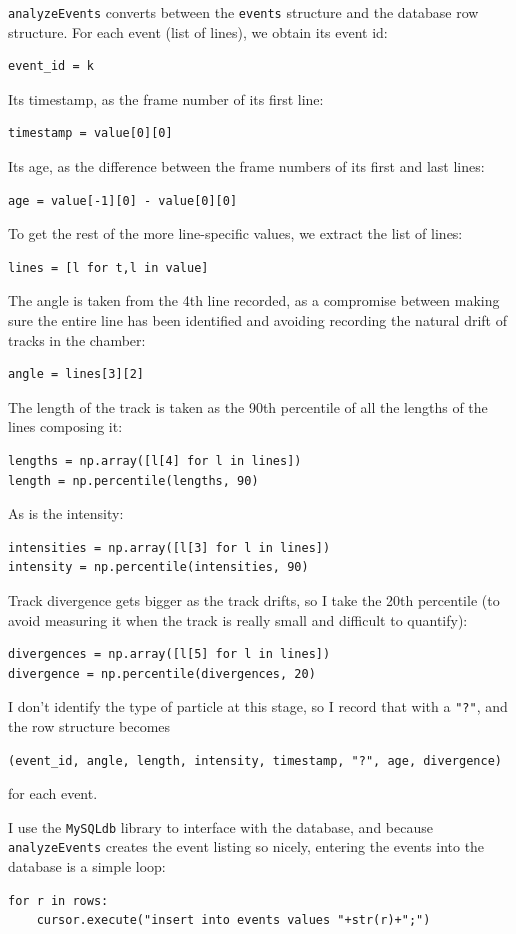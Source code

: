 \documentclass[notitlepage,12pt]{article}
\begin{document}
\texttt{analyzeEvents} converts between the \texttt{events} structure and the database row structure.  For each event (list of lines), we obtain its event id:
\begin{lstlisting}
event_id = k
\end{lstlisting}
Its timestamp, as the frame number of its first line:
\begin{lstlisting}
timestamp = value[0][0]
\end{lstlisting}
Its age, as the difference between the frame numbers of its first and last lines:
\begin{lstlisting}
age = value[-1][0] - value[0][0]
\end{lstlisting}
To get the rest of the more line-specific values, we extract the list of lines:
\begin{lstlisting}
lines = [l for t,l in value]
\end{lstlisting}
The angle is taken from the 4th line recorded, as a compromise between making sure the entire line has been identified and avoiding recording the natural drift of tracks in the chamber:
\begin{lstlisting}
angle = lines[3][2]
\end{lstlisting}
The length of the track is taken as the 90th percentile of all the lengths of the lines composing it:
\begin{lstlisting}
lengths = np.array([l[4] for l in lines])
length = np.percentile(lengths, 90)
\end{lstlisting}
As is the intensity:
\begin{lstlisting}
intensities = np.array([l[3] for l in lines])
intensity = np.percentile(intensities, 90)
\end{lstlisting}
Track divergence gets bigger as the track drifts, so I take the 20th percentile (to avoid measuring it when the track is really small and difficult to quantify):
\begin{lstlisting}
divergences = np.array([l[5] for l in lines])
divergence = np.percentile(divergences, 20)
\end{lstlisting}
I don't identify the type of particle at this stage, so I record that with a \texttt{"?"}, and the row structure becomes
\begin{lstlisting}
(event_id, angle, length, intensity, timestamp, "?", age, divergence)
\end{lstlisting}
for each event.

I use the \texttt{MySQLdb} library to interface with the database, and because \texttt{analyzeEvents} creates the event listing so nicely, entering the events into the database is a simple loop:
\begin{lstlisting}
for r in rows:
    cursor.execute("insert into events values "+str(r)+";")
\end{lstlisting}
\end{document}
